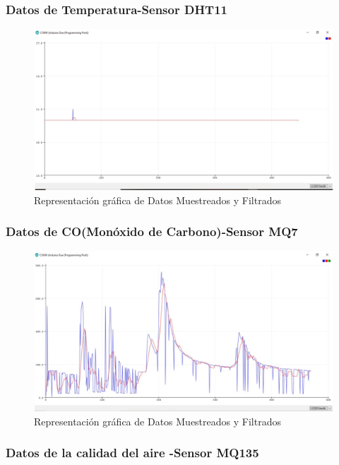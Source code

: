 \documentclass[10pt,a4paper]{article}
\begin{document}
\begin{multicols}{2}
\begin{itemize}
\subsubsection{Datos de Temperatura-Sensor DHT11}

\begin{figure}[H]
\centering
\includegraphics[scale=0.30]{dianotemperatura.PNG}
\caption{Representación gráfica de Datos Muestreados y Filtrados}
\end{figure}


\subsubsection{Datos de CO(Monóxido de Carbono)-Sensor MQ7}

\begin{figure}[H]
\centering
\includegraphics[scale=0.35]{dianomq7.PNG}
\caption{Representación gráfica de Datos Muestreados y Filtrados}
\end{figure}

\subsubsection{Datos de la calidad del aire -Sensor MQ135}


\end{itemize}
\end{multicols}
\end{document}
